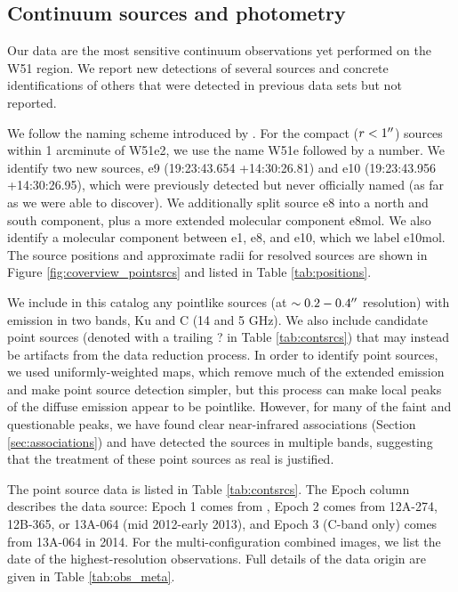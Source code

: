 \subsection{Continuum sources and photometry}
\label{sec:pointsources}
Our data are the most sensitive continuum observations yet performed on the W51
region.  We report new detections of several sources and concrete
identifications of others that were detected in previous data sets but not
reported.

We follow the naming scheme introduced by \citet{Mehringer1994a}.  For the
compact ($r<1\mbox{$^{\prime\prime}$}$) sources within 1 arcminute of W51e2, we use the name
W51e followed by a number.  We identify two new sources, e9 (19:23:43.654
+14:30:26.81) and e10 (19:23:43.956 +14:30:26.95), which were previously
detected but never officially named (as far as we were able to discover).
We additionally split source e8 into a north and south component, plus a more
extended molecular component e8mol.  We also identify a molecular component
between e1, e8, and e10, which we label e10mol.  The source positions
and approximate radii for resolved sources are shown in Figure
\ref{fig:coverview_pointsrcs} and listed in Table \ref{tab:positions}.



We include in this catalog any pointlike sources (at $\sim0.2-0.4\mbox{$^{\prime\prime}$}$
resolution) with emission in two bands, Ku and C (14 and 5 GHz).  We also
include candidate point sources (denoted with a trailing ? in Table
\ref{tab:contsrcs}) that may instead be artifacts from the data reduction
process.  In order to identify point sources, we used uniformly-weighted maps,
which remove much of the extended emission and make point source detection
simpler, but this process can make local peaks of the diffuse emission appear
to be pointlike.  However, for many of the faint and questionable peaks, we
have found clear near-infrared associations (Section \ref{sec:associations})
and have detected the sources in multiple bands, suggesting that the treatment
of these point sources as real is justified.

The point source data is listed in Table \ref{tab:contsrcs}.  The Epoch column
describes the data source: Epoch 1 comes from \citet{Mehringer1994a}, Epoch 2
comes from 12A-274, 12B-365, or 13A-064 (mid 2012-early
2013), and Epoch 3 (C-band only) comes from
13A-064 in 2014. For the multi-configuration combined images, we list the date
of the highest-resolution observations.  Full details of the data origin
are given in Table \ref{tab:obs_meta}.

